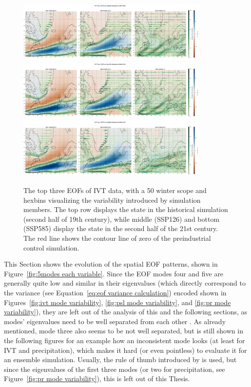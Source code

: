 \begin{figure}[htb]
  \begin{center}
    \includegraphics[width=0.85\textwidth]{figures/ivt_spat_patterns_hexbin_18501899_ssp585_50seasons.png}
    \includegraphics[width=0.85\textwidth]{figures/ivt_spat_patterns_hexbin_20502100_ssp126_50seasons.png}
    \includegraphics[width=0.85\textwidth]{figures/ivt_spat_patterns_hexbin_20502100_ssp585_50seasons.png}
  \end{center}
  \caption{The top three EOFs of IVT data, with a 50 winter scope and hexbins visualizing the variability introduced by simulation members. The top row displays the state in the historical simulation (second half of 19th century), while middle (SSP126) and bottom (SSP585) display the state in the second half of the 21st century. The red line shows the contour line of zero of the preindustrial control simulation. }\label{fig:ivt eof evolution}
\end{figure}


This Section shows the evolution of the spatial EOF patterns, shown in Figure~\ref{fig:5modes each variable}. 
Since the EOF modes four and five are generally quite low and similar in their eigenvalues (which directly correspond to the variance (see Equation~\ref{eq:eof variance calculation}) encoded shown in Figures~\ref{fig:ivt mode variability}, \ref{fig:psl mode variability}, and \ref{fig:pr mode variability}), they are left out of the analysis of this and the following sections, as modes' eigenvalues need to be well separated from each other \cite{hannachi_empirical_2007}. 
As already mentioned, mode three also seems to be not well separated, but is still shown in the following figures for an example how an inconsistent mode looks (at least for IVT and precipitation), which makes it hard (or even pointless) to evaluate it for an ensemble simulation.  
Usually, the rule of thumb introduced by  is used, but since the eigenvalues of the first three modes (or two for precipitation, see Figure~\ref{fig:pr mode variability}), this is left out of this Thesis. 

